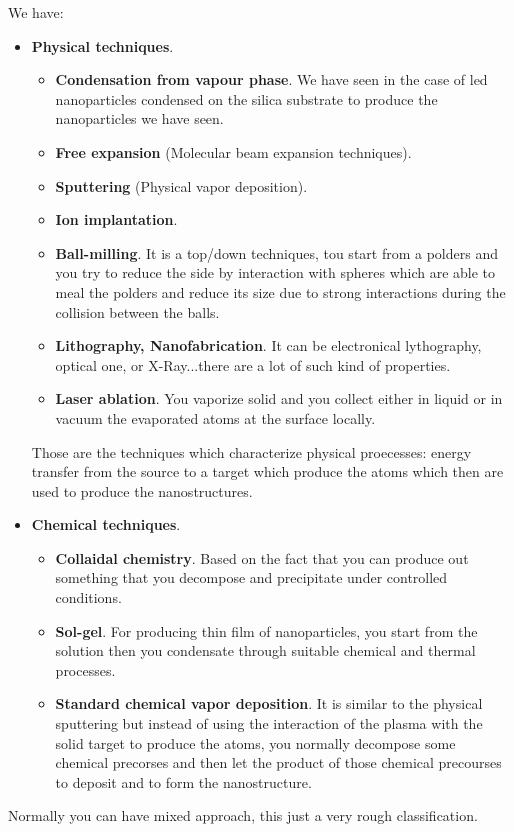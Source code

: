 \documentclass[../main/main.tex]{subfiles}
\begin{document}
We have:
\begin{itemize}
\item \textbf{Physical techniques}.
\begin{itemize}
\item \textbf{Condensation from vapour phase}. We have seen in the case of led nanoparticles condensed on the silica substrate to produce the nanoparticles we have seen.
\item \textbf{Free expansion} (Molecular beam expansion techniques).
\item \textbf{Sputtering} (Physical vapor deposition).
\item \textbf{Ion implantation}.
\item \textbf{Ball-milling}. It is a top/down techniques, tou start from a polders and you try to reduce the side by interaction with spheres which are able to meal the polders and reduce its size due to strong interactions during the collision between the balls.
\item \textbf{Lithography, Nanofabrication}. It can be electronical lythography, optical one, or X-Ray...there are a lot of such kind of properties.
\item \textbf{Laser ablation}. You vaporize solid and you collect either in liquid or in vacuum the evaporated atoms at the surface locally.
\end{itemize}
Those are the techniques which characterize physical proecesses: energy transfer from the source to a target which produce the atoms which then are used to produce the nanostructures.
\item \textbf{Chemical techniques}.
\begin{itemize}
\item \textbf{Collaidal chemistry}. Based on the fact that you can produce out something that you decompose and precipitate under controlled conditions.
\item \textbf{Sol-gel}. For producing thin film of nanoparticles, you start from the solution then you condensate through suitable chemical and thermal processes.
\item \textbf{Standard chemical vapor deposition}. It is similar to the physical sputtering but instead of using the interaction of the plasma with the solid target to produce the atoms, you normally decompose some chemical precorses and then let the product of those chemical precourses to deposit and to form the nanostructure.
\end{itemize}

\end{itemize}
Normally you can have mixed approach, this just a very rough classification.
\end{document}
